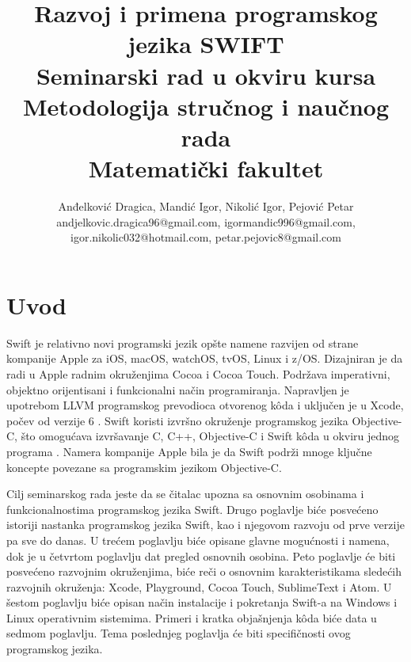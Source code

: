 \documentclass[a4paper]{article}
\begin{document}
\title{Razvoj i primena programskog jezika SWIFT \\ \small{Seminarski rad u okviru kursa\\Metodologija stručnog i naučnog rada\\ Matematički fakultet}}

\author{Anđelković Dragica, Mandić Igor, Nikolić Igor, Pejović  Petar\\ andjelkovic.dragica96@gmail.com,  igormandic996@gmail.com, \\ igor.nikolic032@hotmail.com, petar.pejovic8@gmail.com}


\maketitle



\tableofcontents

\newpage

\section{Uvod}
\label{sec:prviDeo}
Swift je relativno novi programski jezik opšte namene razvijen od strane kompanije Apple za iOS, macOS, watchOS, tvOS, Linux i z/OS. Dizajniran je da radi u Apple radnim okruženjima Cocoa i Cocoa Touch. Podržava imperativni, objektno orijentisani i funkcionalni način programiranja. Napravljen je upotrebom LLVM programskog prevodioca otvorenog k\^{o}da i uključen je u Xcode, počev od verzije 6 \cite{swift_sajt}. Swift koristi izvršno okruženje programskog jezika Objective-C, što omogućava izvršavanje C, C++, Objective-C i Swift k\^{o}da u okviru jednog programa \cite{arc_sajt}. Namera kompanije Apple bila je da Swift podrži mnoge ključne koncepte povezane sa programskim jezikom Objective-C.

Cilj seminarskog rada jeste da se čitalac upozna sa osnovnim osobinama i funkcionalnostima programskog jezika Swift. Drugo poglavlje biće posvećeno istoriji nastanka programskog jezika Swift, kao i njegovom razvoju od prve verzije pa sve do danas. U trećem poglavlju biće opisane glavne mogućnosti i namena, dok je u četvrtom poglavlju dat pregled osnovnih osobina. Peto poglavlje će biti posvećeno razvojnim okruženjima, biće reči o osnovnim karakteristikama sledećih razvojnih okruženja: Xcode, Playground, Cocoa Touch, SublimeText i Atom. U šestom poglavlju biće opisan način instalacije i pokretanja Swift-a na Windows i Linux operativnim sistemima. Primeri i kratka objašnjenja k\^{o}da biće data u sedmom poglavlju. Tema poslednjeg poglavlja će biti specifičnosti ovog programskog jezika.
\end{document}
